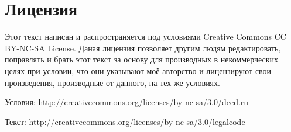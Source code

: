 \documentclass[a4paper,12pt,oneside]{book}
\begin{document}
\pagebreak
\chapter*{Лицензия}

Этот текст написан и распространяется под условиями Creative Commons CC BY-NC-SA License. Даная лицензия позволяет другим людям редактировать, поправлять и брать этот текст за основу для производных в некоммерческих целях при условии, что они указывают моё авторство и лицензируют свои произведения, производные от данного, на тех же условиях.

Условия: \url{http://creativecommons.org/licenses/by-nc-sa/3.0/deed.ru}

Текст: \url{http://creativecommons.org/licenses/by-nc-sa/3.0/legalcode}

\pagebreak
\printindex
\end{document}
